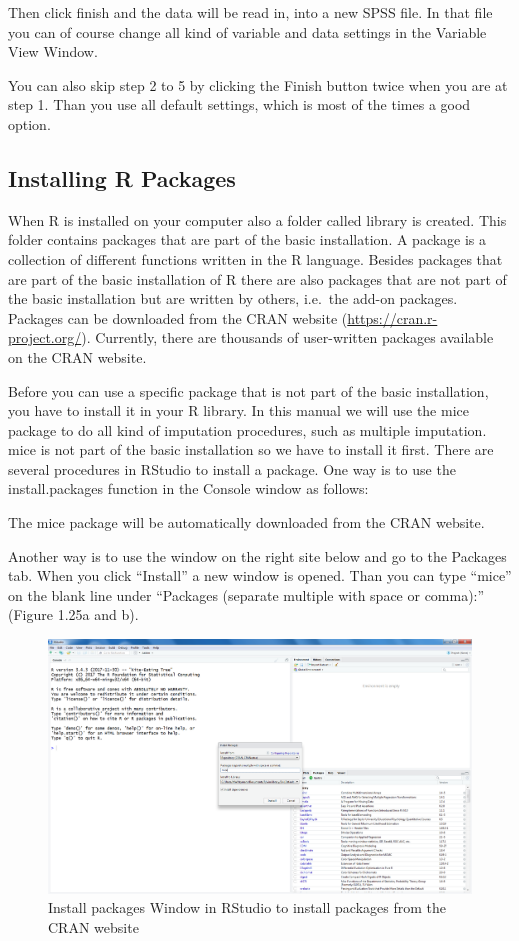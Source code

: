 \documentclass[]{book}
\theoremstyle{definition}
\theoremstyle{definition}
\theoremstyle{definition}
\theoremstyle{remark}
\begin{document}
Then click finish and the data will be read in, into a new SPSS file. In
that file you can of course change all kind of variable and data
settings in the Variable View Window.

You can also skip step 2 to 5 by clicking the Finish button twice when
you are at step 1. Than you use all default settings, which is most of
the times a good option.

\subsection{Installing R Packages}\label{installing-r-packages}

When R is installed on your computer also a folder called library is
created. This folder contains packages that are part of the basic
installation. A package is a collection of different functions written
in the R language. Besides packages that are part of the basic
installation of R there are also packages that are not part of the basic
installation but are written by others, i.e.~the add-on packages.
Packages can be downloaded from the CRAN website
(\url{https://cran.r-project.org/}). Currently, there are thousands of
user-written packages available on the CRAN website.

Before you can use a specific package that is not part of the basic
installation, you have to install it in your R library. In this manual
we will use the mice package to do all kind of imputation procedures,
such as multiple imputation. mice is not part of the basic installation
so we have to install it first. There are several procedures in RStudio
to install a package. One way is to use the install.packages function in
the Console window as follows:

The mice package will be automatically downloaded from the CRAN website.

Another way is to use the window on the right site below and go to the
Packages tab. When you click ``Install'' a new window is opened. Than
you can type ``mice'' on the blank line under ``Packages (separate
multiple with space or comma):'' (Figure 1.25a and b).

\begin{figure}

{\centering \includegraphics[width=0.9\linewidth]{images/fig1.25a} 

}

\caption{Install packages Window in RStudio to install packages from the CRAN website}\label{fig:fig25}
\end{figure}
\end{document}
